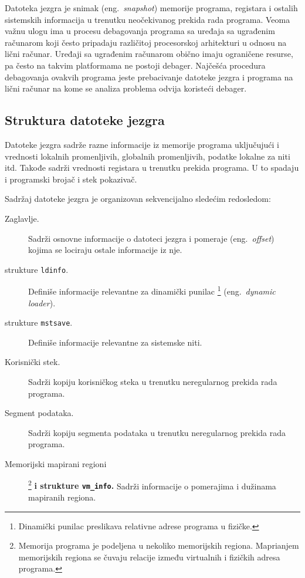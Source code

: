 \documentclass[12pt,oneside]{memoir}
\begin{document}
Datoteka jezgra je snimak (eng.~\emph{snapshot}) memorije programa, registara i ostalih sistemskih informacija u trenutku neočekivanog prekida rada programa. Veoma važnu ulogu ima u procesu debagovanja programa sa uređaja sa ugrađenim računarom koji često pripadaju različitoj procesorskoj arhitekturi u odnosu na lični računar. Uređaji sa ugrađenim računarom obično imaju ograničene resurse, pa često na takvim platformama ne postoji debager. Najčešća procedura debagovanja ovakvih programa jeste prebacivanje datoteke jezgra i programa na lični računar na kome se analiza problema odvija koristeći debager.

\subsection{Struktura datoteke jezgra}

Datoteke jezgra sadrže razne informacije iz memorije programa uključujući i vrednosti lokalnih promenljivih, globalnih promenljivih, podatke lokalne za niti itd. Takođe sadrži vrednosti registara u trenutku prekida programa. U to spadaju i programski brojač i stek pokazivač.

Sadržaj datoteke jezgra je organizovan sekvencijalno sledećim redosledom:

\begin{description}
	\item[Zaglavlje.]
	Sadrži osnovne informacije o datoteci jezgra i pomeraje (eng.\emph{~offset}) kojima se lociraju ostale informacije iz nje.
	\item[strukture \texttt{ldinfo}.]   
	Definiše informacije relevantne za dinamički punilac \footnote{Dinamički punilac preslikava relativne adrese programa u fizičke.} (eng.~\emph{dynamic loader}).
	\item[strukture \texttt{mstsave}.]
	Definiše informacije relevantne za sistemske niti.
	\item[Korisnički stek.]
	Sadrži kopiju korisničkog steka u trenutku neregularnog prekida rada programa.
	\item[Segment podataka.]   
	Sadrži kopiju segmenta podataka u trenutku neregularnog prekida rada programa.
	\item[Memorijski mapirani regioni]\footnote{Memorija programa je podeljena u nekoliko memorijskih regiona. Maprianjem memorijskih regiona se čuvaju relacije između virtualnih i fizičkih adresa programa.} \textbf{i strukture \texttt{vm\_info}.}
	Sadrži informacije o pomerajima i dužinama mapiranih regiona.
\end{description}
\end{document}
